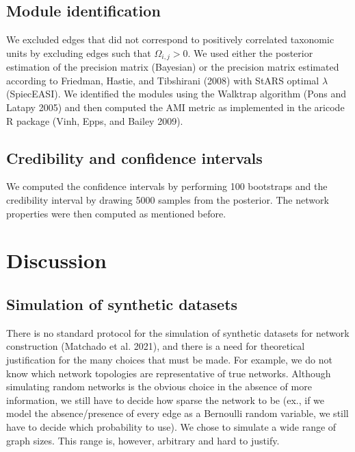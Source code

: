\documentclass[
  a4paper,
]{article}
\begin{document}
\hypertarget{module-identification-1}{%
\subsection{Module identification}\label{module-identification-1}}

We excluded edges that did not correspond to positively correlated
taxonomic units by excluding edges such that \(\Omega_{i, j}>0\). We
used either the posterior estimation of the precision matrix (Bayesian)
or the precision matrix estimated according to Friedman, Hastie, and
Tibshirani (2008) with StARS optimal \(\lambda\) (SpiecEASI). We
identified the modules using the Walktrap algorithm (Pons and Latapy
2005) and then computed the AMI metric as implemented in the aricode R
package (Vinh, Epps, and Bailey 2009).

\hypertarget{credibility-and-confidence-intervals}{%
\subsection{Credibility and confidence
intervals}\label{credibility-and-confidence-intervals}}

We computed the confidence intervals by performing 100 bootstraps and
the credibility interval by drawing 5000 samples from the posterior. The
network properties were then computed as mentioned before.

\hypertarget{discussion}{%
\section{Discussion}\label{discussion}}

\hypertarget{simulation-of-synthetic-datasets-2}{%
\subsection{Simulation of synthetic
datasets}\label{simulation-of-synthetic-datasets-2}}

There is no standard protocol for the simulation of synthetic datasets
for network construction (Matchado et al. 2021), and there is a need for
theoretical justification for the many choices that must be made. For
example, we do not know which network topologies are representative of
true networks. Although simulating random networks is the obvious choice
in the absence of more information, we still have to decide how sparse
the network to be (ex., if we model the absence/presence of every edge
as a Bernoulli random variable, we still have to decide which
probability to use). We chose to simulate a wide range of graph sizes.
This range is, however, arbitrary and hard to justify.
\end{document}
